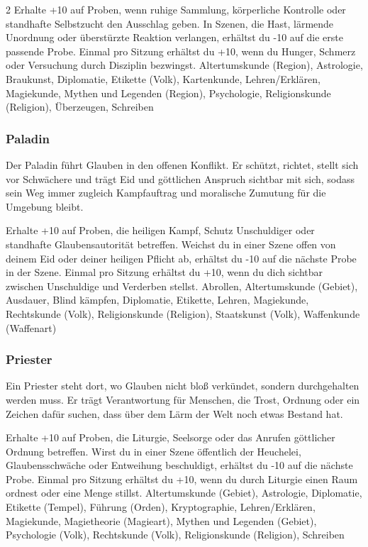 {\begin{multicols*}{2}
        \wegespielwertebox
        {Erhalte +10 auf Proben, wenn ruhige Sammlung, körperliche Kontrolle oder standhafte Selbstzucht den Ausschlag geben.}
        {In Szenen, die Hast, lärmende Unordnung oder überstürzte Reaktion verlangen, erhältst du -10 auf die erste passende Probe.}
        {Einmal pro Sitzung erhältst du +10, wenn du Hunger, Schmerz oder Versuchung durch Disziplin bezwingst.}
        {Altertumskunde (Region), Astrologie, Braukunst, Diplomatie, Etikette (Volk), Kartenkunde, Lehren/Erklären, Magiekunde, Mythen und Legenden (Region), Psychologie, Religionskunde (Religion), Überzeugen, Schreiben}

        \subsubsection*{Paladin}
        Der Paladin führt Glauben in den offenen Konflikt. Er schützt, richtet, stellt sich vor Schwächere und trägt Eid und göttlichen Anspruch sichtbar mit sich, sodass sein Weg immer zugleich Kampfauftrag und moralische Zumutung für die Umgebung bleibt.

        \wegespielwertebox
        {Erhalte +10 auf Proben, die heiligen Kampf, Schutz Unschuldiger oder standhafte Glaubensautorität betreffen.}
        {Weichst du in einer Szene offen von deinem Eid oder deiner heiligen Pflicht ab, erhältst du -10 auf die nächste Probe in der Szene.}
        {Einmal pro Sitzung erhältst du +10, wenn du dich sichtbar zwischen Unschuldige und Verderben stellst.}
        {Abrollen, Altertumskunde (Gebiet), Ausdauer, Blind kämpfen, Diplomatie, Etikette, Lehren, Magiekunde, Rechtskunde (Volk), Religionskunde (Religion), Staatskunst (Volk), Waffenkunde (Waffenart)}

        \subsubsection*{Priester}
        Ein Priester steht dort, wo Glauben nicht bloß verkündet, sondern durchgehalten werden muss. Er trägt Verantwortung für Menschen, die Trost, Ordnung oder ein Zeichen dafür suchen, dass über dem Lärm der Welt noch etwas Bestand hat.

        \wegespielwertebox
        {Erhalte +10 auf Proben, die Liturgie, Seelsorge oder das Anrufen göttlicher Ordnung betreffen.}
        {Wirst du in einer Szene öffentlich der Heuchelei, Glaubensschwäche oder Entweihung beschuldigt, erhältst du -10 auf die nächste Probe.}
        {Einmal pro Sitzung erhältst du +10, wenn du durch Liturgie einen Raum ordnest oder eine Menge stillst.}
        {Altertumskunde (Gebiet), Astrologie, Diplomatie, Etikette (Tempel), Führung (Orden), Kryptographie, Lehren/Erklären, Magiekunde, Magietheorie (Magieart), Mythen und Legenden (Gebiet), Psychologie (Volk), Rechtskunde (Volk), Religionskunde (Religion), Schreiben}


\end{multicols*}}
